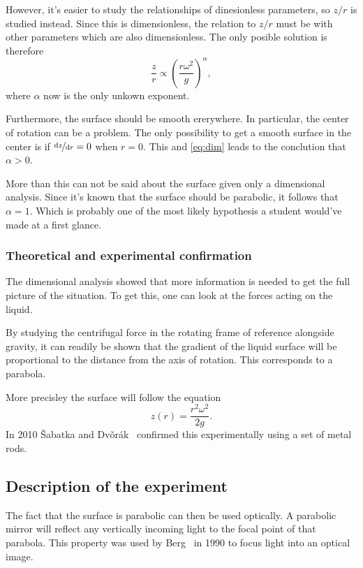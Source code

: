 \documentclass[11pt,towcolumn, swedish, english]{article}
\begin{document}
However, it's easier to study the relationships of dinesionless
parameters, so $z/r$ is studied instead. Since this is dimensionless,
the relation to $z/r$ must be with other parameters which are also
dimensionless. The only posible solution is therefore
\begin{equation}\label{eq:dim}
\frac{z}{r} \propto \left(\frac{r\omega^2}{g}\right)^\alpha, 
\end{equation}
where $\alpha$ now is the only unkown exponent.

Furthermore, the surface should be smooth ererywhere. In particular,
the center of rotation can be a problem. The only possibility to get a
smooth surface in the center is if $\nicefrac{\mathrm{d}{z}}{\mathrm{d}{r}}=0$ when
$r=0$. This and \eqref{eq:dim} leads to the conclution that $\alpha>0$.

More than this can not be said about the surface given only a
dimensional analysis. Since it's known that the surface should be
parabolic, it follows that $\alpha=1$. 
Which is probably one of the most likely hypothesis a student would've
made at a first glance.  

\subsubsection{Theoretical and experimental confirmation}
The dimensional analysis showed that more information is needed to get
the full picture of the situation. To get this, one can look at the
forces acting on the liquid.

By studying the centrifugal force in the rotating frame of reference
alongside gravity, it can readily be shown that the gradient of the
liquid surface will be proportional to the distance from the axis of
rotation. This corresponds to a parabola. 

More precisley the surface will follow the
equation~\cite{Sabatka2010, Berg1990} 
\begin{equation}\label{eq:parabola}
z(r)=\frac{r^2\omega^2}{2g}.
\end{equation}
In 2010 \v{S}abatka and
Dv\v{o}rák~\cite{Sabatka2010} confirmed this experimentally using a
set of metal rods. 


\subsection{Description of the experiment }
The fact that the surface is parabolic can then be used optically. A
parabolic mirror will reflect any vertically incoming light to the
focal point of that parabola. This property was used by
Berg~\cite{Berg1990} in 1990 to focus light into an optical image. 
\end{document}
